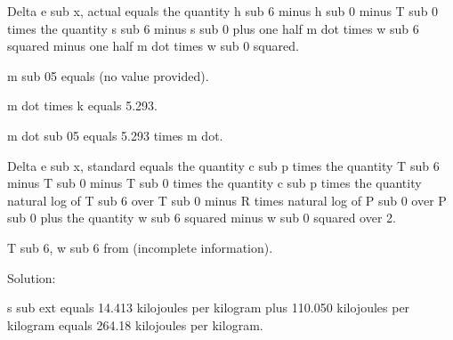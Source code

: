 Delta e sub x, actual equals the quantity h sub 6 minus h sub 0 minus T sub 0 times the quantity s sub 6 minus s sub 0 plus one half m dot times w sub 6 squared minus one half m dot times w sub 0 squared.

m sub 05 equals (no value provided).

m dot times k equals 5.293.

m dot sub 05 equals 5.293 times m dot.

Delta e sub x, standard equals the quantity c sub p times the quantity T sub 6 minus T sub 0 minus T sub 0 times the quantity c sub p times the quantity natural log of T sub 6 over T sub 0 minus R times natural log of P sub 0 over P sub 0 plus the quantity w sub 6 squared minus w sub 0 squared over 2.

T sub 6, w sub 6 from (incomplete information).

Solution:

s sub ext equals 14.413 kilojoules per kilogram plus 110.050 kilojoules per kilogram equals 264.18 kilojoules per kilogram.